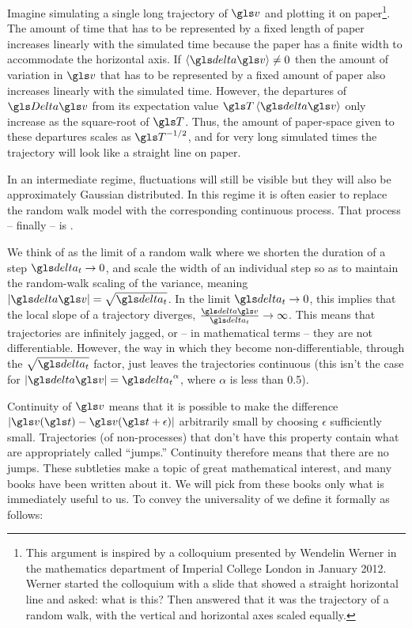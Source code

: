 Imagine simulating a single long trajectory of $\gv$ and plotting it on paper\footnote{This argument is
inspired by a colloquium presented by Wendelin Werner in the mathematics department of Imperial 
College London in January 2012. 
Werner started the colloquium with a slide that showed a straight horizontal line and asked: what is this? 
Then answered that it was the trajectory of a random walk, with the vertical and horizontal axes scaled equally.}. 
The amount of 
time that has to be represented by a fixed length of paper increases linearly with the simulated time
because the paper has a finite width to accommodate the horizontal axis. 
If $\ave{\d \gv} \neq 0$ then the amount of variation in $\gv$ that has to be represented by a fixed
amount of paper also increases linearly with the simulated time. However, the departures of $\D\gv$ from
its expectation value $\T \ave{\d \gv}$ only increase as the square-root of $\T$. Thus, the 
amount of paper-space given to these departures scales as $\T^{-1/2}$, and for very long simulated
times the trajectory will look like a straight line on paper.

In an intermediate regime, fluctuations will still be visible but they will also be approximately 
Gaussian distributed. In this regime it is often easier to replace the random walk model 
with the corresponding continuous process. That process -- finally -- is \BM. 

We think of \BM
as the limit of a random walk where we shorten the duration of a step $\dt \to 0$, and 
scale the width of an individual step so as to maintain the random-walk scaling of the variance, meaning
$|\d\gv|=\sqrt{\dt}$. In the limit $\dt\to0$, this implies that the local slope of a \BM trajectory diverges, 
$\frac{\d\gv}{\dt}\to\infty$. This means that \BM trajectories 
are infinitely jagged, or -- in mathematical terms -- they are not differentiable. However, the way in
which they become non-differentiable, through the $\sqrt{\dt}$ factor, just leaves the 
trajectories continuous (this isn't the case for $|\d\gv|=\dt^\alpha$, where $\alpha$ is less than 0.5). 

Continuity of $\gv$ 
means that it is possible to make the difference $|\gv(\t)-\gv(\t+\epsilon)|$ arbitrarily small by choosing
$\epsilon$ sufficiently small. Trajectories (of non-\BM processes) that don't have this property contain what 
are appropriately called ``jumps.'' Continuity therefore means that there are no jumps. These subtleties make \BM 
a topic of great mathematical interest, and many books have been written about it. We will pick from 
these books only what is immediately useful to us. To convey the universality of \BM we define it formally as follows:

